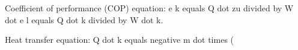 Coefficient of performance (COP) equation:  
e k equals Q dot zu divided by W dot e l equals Q dot k divided by W dot k.  

Heat transfer equation:  
Q dot k equals negative m dot times (
